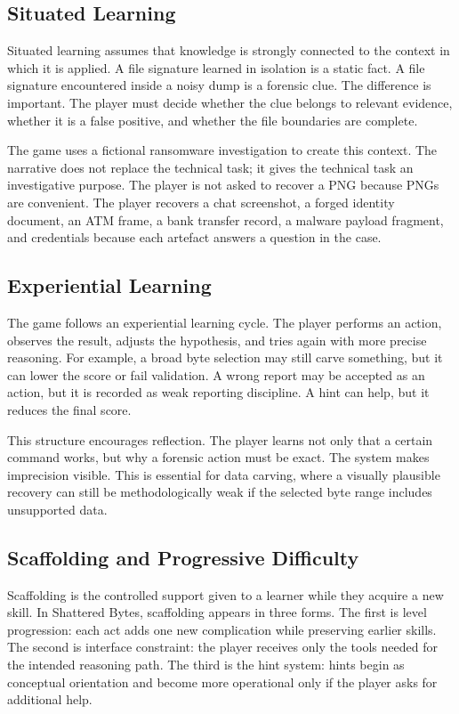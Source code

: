 \documentclass[11pt,a4paper]{article}
\newcommand{\projecttitle}{Shattered Bytes}
\begin{document}
\subsection{Situated Learning}

Situated learning assumes that knowledge is strongly connected to the context in which it is applied. A file signature learned in isolation is a static fact. A file signature encountered inside a noisy dump is a forensic clue. The difference is important. The player must decide whether the clue belongs to relevant evidence, whether it is a false positive, and whether the file boundaries are complete.

The game uses a fictional ransomware investigation to create this context. The narrative does not replace the technical task; it gives the technical task an investigative purpose. The player is not asked to recover a PNG because PNGs are convenient. The player recovers a chat screenshot, a forged identity document, an ATM frame, a bank transfer record, a malware payload fragment, and credentials because each artefact answers a question in the case.

\subsection{Experiential Learning}

The game follows an experiential learning cycle. The player performs an action, observes the result, adjusts the hypothesis, and tries again with more precise reasoning. For example, a broad byte selection may still carve something, but it can lower the score or fail validation. A wrong report may be accepted as an action, but it is recorded as weak reporting discipline. A hint can help, but it reduces the final score.

This structure encourages reflection. The player learns not only that a certain command works, but why a forensic action must be exact. The system makes imprecision visible. This is essential for data carving, where a visually plausible recovery can still be methodologically weak if the selected byte range includes unsupported data.

\subsection{Scaffolding and Progressive Difficulty}

Scaffolding is the controlled support given to a learner while they acquire a new skill. In \projecttitle{}, scaffolding appears in three forms. The first is level progression: each act adds one new complication while preserving earlier skills. The second is interface constraint: the player receives only the tools needed for the intended reasoning path. The third is the hint system: hints begin as conceptual orientation and become more operational only if the player asks for additional help.
\end{document}
